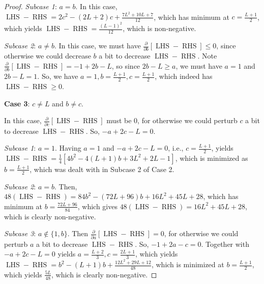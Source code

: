 \documentclass[12pt]{amsart}
\theoremstyle{definition}
\newcommand{\tb}{\textbf}
\newcommand{\vsss}{\vspace{6mm}}
\DeclareMathOperator{\LHS}{LHS}
\DeclareMathOperator{\RHS}{RHS}
\begin{document}
\begin{proof}
\vspace{1.5mm}

\textit{Subcase 1}: $a=b$. In this case, $\LHS-\RHS = 2c^2-(2L+2)c+\frac{7L^2+10L+7}{12}$, which has minimum at $c = \frac{L+1}{2}$, which yields $\LHS-\RHS = \frac{(L-1)^2}{12}$, which is non-negative.

\vspace{1.5mm}

\textit{Subcase 2}: $a \not = b$. In this case, we must have $\frac{\partial}{\partial b}[\LHS-\RHS] \le 0$, since otherwise we could decrease $b$ a bit to decrease $\LHS-\RHS$. Note $\frac{\partial}{\partial b}[\LHS-\RHS] = -1+2b-L$, so since $2b-L \ge a$, we must have $a=1$ and $2b-L = 1$. So, we have $a=1,b=\frac{L+1}{2},c=\frac{L+1}{2}$, which indeed has $\LHS-\RHS \ge 0$.

\vsss

\tb{Case 3}: $c \not = L$ and $b \not = c$. 

\vspace{1.5mm}

In this case, $\frac{\partial}{\partial c}[\LHS-\RHS]$ must be $0$, for otherwise we could perturb $c$ a bit to decrease $\LHS-\RHS$. So, $-a+2c-L = 0$. 

\vspace{1.5mm}

\textit{Subcase 1}: $a = 1$. Having $a=1$ and $-a+2c-L=0$, i.e., $c = \frac{L+1}{2}$, yields $\LHS-\RHS = \frac{1}{4}[4b^2-4(L+1)b+3L^2+2L-1]$, which is minimized as $b = \frac{L+1}{2}$, which was dealt with in Subcase 2 of Case 2.

\vspace{1.5mm}

\textit{Subcase 2}: $a = b$. Then, $48(\LHS-\RHS) = 84b^2-(72L+96)b+16L^2+45L+28$, which has minimum at $b = \frac{72L+96}{84}$, which gives $48(\LHS-\RHS) = 16L^2+45L+28$, which is clearly non-negative.

\vspace{1.5mm}

\textit{Subcase 3}: $a \not \in \{1,b\}$. Then $\frac{\partial}{\partial a}[\LHS-\RHS] = 0$, for otherwise we could perturb $a$ a bit to decrease $\LHS-\RHS$. So, $-1+2a-c = 0$. Together with $-a+2c-L = 0$ yields $a = \frac{L+2}{3}, c = \frac{2L+1}{3}$, which yields $\LHS-\RHS = b^2-(L+1)b+\frac{12L^2+29L+12}{48}$, which is minimized at $b = \frac{L+1}{2}$, which yields $\frac{5L}{48}$, which is clearly non-negative. 
\end{proof}
\end{document}
